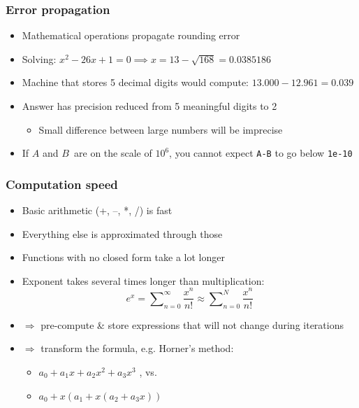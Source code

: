 \documentclass[bigger]{beamer}
\begin{document}
\begin{frame}%
\frametitle{Error propagation}

\begin{itemize}
\item Mathematical operations propagate rounding error

\item Solving: $x^{2}-26x+1=0\implies x=13-\sqrt{168}=0.0385186$

\item Machine that stores 5 decimal digits would compute: $%
13.000-12.961=0.039$

\item Answer has precision reduced from 5 meaningful digits to 2

\begin{itemize}
\item Small difference between large numbers will be imprecise
\end{itemize}

\item If $A$ and $B$\texttt{\ }are on the scale of $10^{6}$, \newline
you cannot expect \texttt{A-B} to go below \texttt{1e-10}
\end{itemize}


\end{frame}%

\begin{frame}%
\frametitle{Computation speed}

\begin{itemize}
\item Basic arithmetic (+, --, *, /) is fast

\item Everything else is approximated through those

\item Functions with no closed form take a lot longer

\item Exponent takes several times longer than multiplication:%
\begin{equation*}
e^{x}=\sum\nolimits_{n=0}^{\infty }\frac{x^{n}}{n!}\approx
\sum\nolimits_{n=0}^{N}\frac{x^{n}}{n!}
\end{equation*}

\item $\Rightarrow $ pre-compute \& store expressions that will not change
during iterations

\item $\Rightarrow $ transform the formula, e.g. Horner's method:

\begin{itemize}
\item $a_{0}+a_{1}x+a_{2}x^{2}+a_{3}x^{3}$ , vs.

\item $a_{0}+x\left( a_{1}+x\left( a_{2}+a_{3}x\right) \right) $
\end{itemize}
\end{itemize}


\end{frame}%
\end{document}
